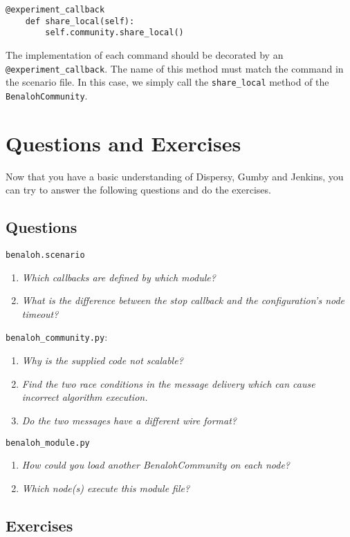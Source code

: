 \documentclass{article}
\begin{document}
\begin{lstlisting}[frame=single]
    @experiment_callback
    def share_local(self):
        self.community.share_local()
\end{lstlisting}

The implementation of each command should be decorated by an \texttt{@experiment\_callback}.
The name of this method must match the command in the scenario file.
In this case, we simply call the \texttt{share\_local} method of the \texttt{BenalohCommunity}.

\section{Questions and Exercises}
Now that you have a basic understanding of Dispersy, Gumby and Jenkins, you can try to answer the following questions and do the exercises.

\subsection{Questions}
\texttt{benaloh.scenario}
\begin{enumerate}
\item \textit{Which callbacks are defined by which module?}
\item \textit{What is the difference between the stop callback and the configuration's node timeout?}
\end{enumerate}
\texttt{benaloh\_community.py}:
\begin{enumerate}
\item \textit{Why is the supplied code not scalable?}
\item \textit{Find the two race conditions in the message delivery which can cause incorrect algorithm execution.}
\item \textit{Do the two messages have a different wire format?}
\end{enumerate}
\texttt{benaloh\_module.py}
\begin{enumerate}
\item \textit{How could you load another BenalohCommunity on each node?}
\item \textit{Which node(s) execute this module file?}
\end{enumerate}

\subsection{Exercises}
\end{document}
